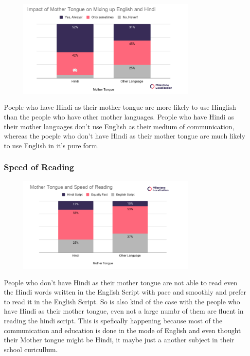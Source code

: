 \documentclass{article}
\begin{document}
\begin{figure}[H]
    \centering
    \includegraphics[width=0.8\textwidth]{plots/mother_mixing_language.png}
\end{figure}
Poeple who have Hindi as their mother tongue are more likely to use Hinglish than the people who have other mother languages. People who have Hindi as their mother languages don't use English as their medium of communication, whereas the poeple who don't have Hindi as their mother tongue are much likely to use English in it's pure form. 

\subsubsection{Speed of Reading}

\begin{figure}[H]
    \centering
    \includegraphics[width=0.8\textwidth]{plots/mother_faster_read.png}
\end{figure}
People who don't have Hindi as their mother tongue are not able to read even the Hindi words written in the English Script with pace and smoothly and prefer to read it in the English Script. So is also kind of the case with the people who have Hindi as their mother tongue, even not a large numbr of them are fluent in reading the hindi script. This is spefically happening because most of the communication and education is done in the mode of English and even thought their Mother tongue might be Hindi, it maybe just a another subject in their school curicullum.
\end{document}
